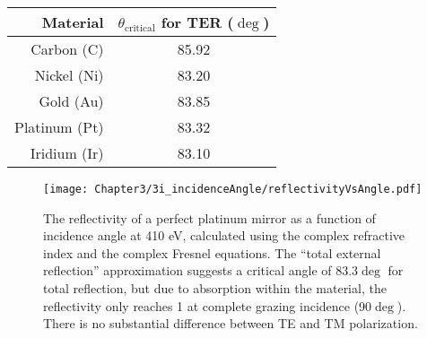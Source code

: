 \begin{table}[p]
   \centering
   \begin{tabular}{@{} r c @{}} %
\toprule
Material    & $\theta_{\mathrm{critical}}$ for TER ($\deg$)\\
\midrule
Carbon (C) & 85.92\\
Nickel (Ni) & 83.20\\
Gold (Au)& 83.85\\
Platinum (Pt)& 83.32\\
Iridium (Ir)& 83.10\\
\bottomrule
   \end{tabular}
   \label{3i-2}
\end{table}

\begin{figure}[p] %
   \centering
   \texttt{[image: Chapter3/3i\_incidenceAngle/reflectivityVsAngle.pdf]} 
   \caption[The reflectivity of a perfect platinum mirror as a function of incidence angle at 410 eV, calculated using the complex refractive index and the complex Fresnel equations.]{The reflectivity of a perfect platinum mirror as a function of incidence angle at 410 eV, calculated using the complex refractive index and the complex Fresnel equations.  The ``total external reflection'' approximation suggests a critical angle of 83.3$\deg$ for total reflection, but due to absorption within the material, the reflectivity only reaches 1 at complete grazing incidence (90$\deg$).  There is no substantial difference between TE and TM polarization.}
   \label{reflectionVsAngle}
\end{figure}

